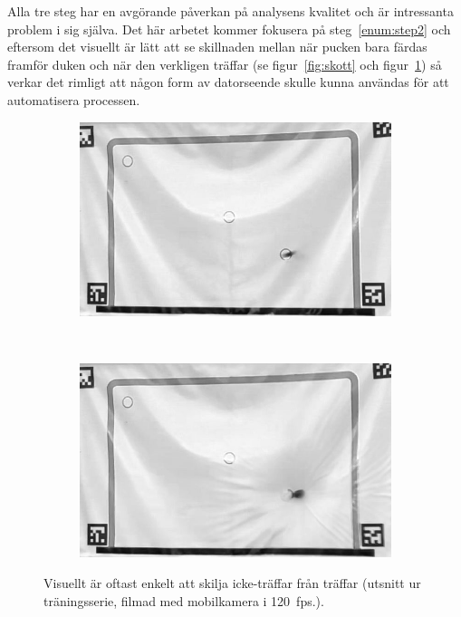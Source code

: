 \documentclass[a4paper,12pt]{article}
\begin{document}
Alla tre steg har en avgörande påverkan på analysens kvalitet och är
intressanta problem i sig själva. Det här arbetet kommer fokusera på
steg~\ref{enum:step2} och eftersom det visuellt är lätt att se skillnaden
mellan när pucken bara färdas framför duken och när den verkligen träffar
(se figur~\ref{fig:skott} och figur~\ref{fig:hit-not-hit}) så verkar det
rimligt att någon form av datorseende skulle kunna användas för att
automatisera processen.
\begin{figure}[ht]
  \centering
  \begin{subfigure}[t]{\textwidth}
    \centering
    \includegraphics[width=\linewidth]{photos/canvas-not-hit.jpg}
  \end{subfigure}\\
  \begin{subfigure}[t]{\textwidth}
    \centering
    \includegraphics[width=\linewidth]{photos/canvas-hit.jpg}
  \end{subfigure}%
  \caption{Visuellt är oftast enkelt att skilja icke-träffar från
    träffar (utsnitt ur träningsserie, filmad med mobilkamera i
    120~fps.).\label{fig:hit-not-hit}}
\end{figure}
\end{document}
